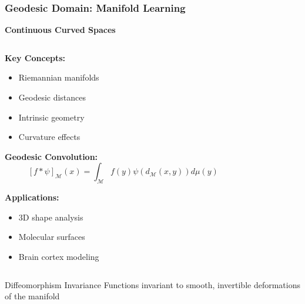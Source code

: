 \begin{frame}[fragile]\frametitle{Geodesic Domain: Manifold Learning}

\begin{center}
\textbf{Continuous Curved Spaces}
\end{center}

\begin{columns}
\begin{column}{0.6\textwidth}
\textbf{Key Concepts:}
\begin{itemize}
\item Riemannian manifolds
\item Geodesic distances
\item Intrinsic geometry
\item Curvature effects
\end{itemize}

\vspace{0.5cm}
\textbf{Geodesic Convolution:}
$$[f * \psi]_{\mathcal{M}}(x) = \int_{\mathcal{M}} f(y) \psi(d_{\mathcal{M}}(x,y)) d\mu(y)$$

\textbf{Applications:}
\begin{itemize}
\item 3D shape analysis
\item Molecular surfaces
\item Brain cortex modeling
\end{itemize}
\end{column}
\begin{column}{0.4\textwidth}

\end{column}
\end{columns}

\begin{block}{Diffeomorphism Invariance}
Functions invariant to smooth, invertible deformations of the manifold
\end{block}

\end{frame}


